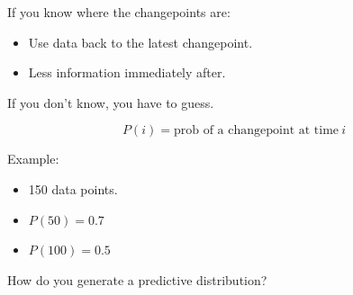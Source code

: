 \documentclass[pdf,letterpaper,allen]{prosper}
\begin{document}
\begin{slide}{}

If you know where the changepoints are:

\begin{itemize}

\item Use data back to the latest changepoint.

\item Less information immediately after.

\end{itemize}

\end{slide}



\begin{slide}{}

If you don't know, you have to guess.

\[P(i) = \mbox{prob of a changepoint at time}\ i\]

Example:

\begin{itemize}

\item 150 data points.

\item $P(50) = 0.7$

\item $P(100) = 0.5$

\end{itemize}

How do you generate a predictive distribution?


\end{slide}
\end{document}
